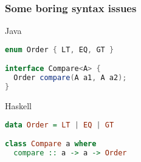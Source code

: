 \begin{frame}[fragile]
\frametitle{Some boring syntax issues}
\begin{block}{Java}
\begin{lstlisting}[style=language,language=java]
enum Order { LT, EQ, GT }

interface Compare<A> {
  Order compare(A a1, A a2);
}
\end{lstlisting}
\end{block}
\begin{block}{Haskell}
\begin{lstlisting}[style=language,language=haskell]
data Order = LT | EQ | GT

class Compare a where
  compare :: a -> a -> Order
\end{lstlisting}
\end{block}
\end{frame}